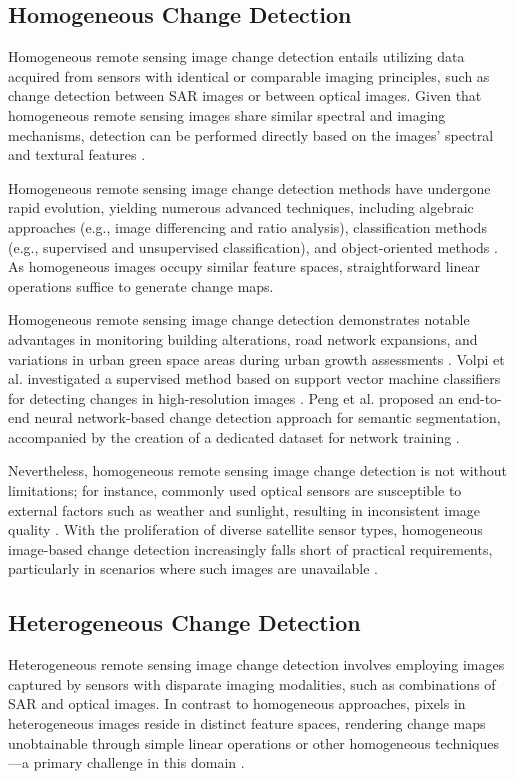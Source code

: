 \documentclass[a4paper,fleqn]{cas-dc}
\begin{document}
\subsection{Homogeneous Change Detection}
Homogeneous remote sensing image change detection entails utilizing data acquired from sensors with identical or comparable imaging principles, such as change detection between SAR images or between optical images. Given that homogeneous remote sensing images share similar spectral and imaging mechanisms, detection can be performed directly based on the images' spectral and textural features \cite{B11}.

Homogeneous remote sensing image change detection methods have undergone rapid evolution, yielding numerous advanced techniques, including algebraic approaches (e.g., image differencing and ratio analysis), classification methods (e.g., supervised and unsupervised classification), and object-oriented methods \cite{B12}. As homogeneous images occupy similar feature spaces, straightforward linear operations suffice to generate change maps.

Homogeneous remote sensing image change detection demonstrates notable advantages in monitoring building alterations, road network expansions, and variations in urban green space areas during urban growth assessments \cite{B13}. Volpi et al. investigated a supervised method based on support vector machine classifiers for detecting changes in high-resolution images \cite{B14}. Peng et al. proposed an end-to-end neural network-based change detection approach for semantic segmentation, accompanied by the creation of a dedicated dataset for network training \cite{B15}.

Nevertheless, homogeneous remote sensing image change detection is not without limitations; for instance, commonly used optical sensors are susceptible to external factors such as weather and sunlight, resulting in inconsistent image quality \cite{B16}. With the proliferation of diverse satellite sensor types, homogeneous image-based change detection increasingly falls short of practical requirements, particularly in scenarios where such images are unavailable \cite{B17}.

\subsection{Heterogeneous Change Detection}
Heterogeneous remote sensing image change detection involves employing images captured by sensors with disparate imaging modalities, such as combinations of SAR and optical images. In contrast to homogeneous approaches, pixels in heterogeneous images reside in distinct feature spaces, rendering change maps unobtainable through simple linear operations or other homogeneous techniques—a primary challenge in this domain \cite{B18}.
\end{document}
